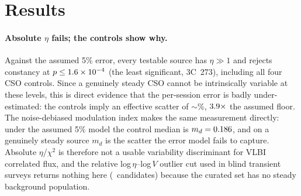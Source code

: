 \documentclass[twocolumn]{aastex631}
\begin{document}
\section{Results}
\paragraph{Absolute $\eta$ fails; the controls show why.} Against the assumed 5\% error, every
testable source has $\eta\gg1$ and rejects constancy at $p\leq1.6\times10^{-4}$ (the least
significant, 3C~273), including all four CSO controls. Since a genuinely
steady CSO cannot be intrinsically variable at these levels, this is direct evidence that the per-session
error is badly under-estimated: the controls imply an effective scatter of $\sim$\viEffScatterPct\%,
$3.9\times$ the assumed floor. The noise-debiased modulation index makes the same
measurement directly: under the assumed 5\% model the control median is $m_d=0.186$, and on a
genuinely steady source $m_d$ is the scatter the error model fails to capture. Absolute $\eta$/$\chi^2$ is therefore not a usable variability discriminant for VLBI
correlated flux, and the relative log\,$\eta$--log\,$V$ outlier cut used in blind transient surveys
returns nothing here (\viNcand\ candidates) because the curated set has no steady background population.
\end{document}
